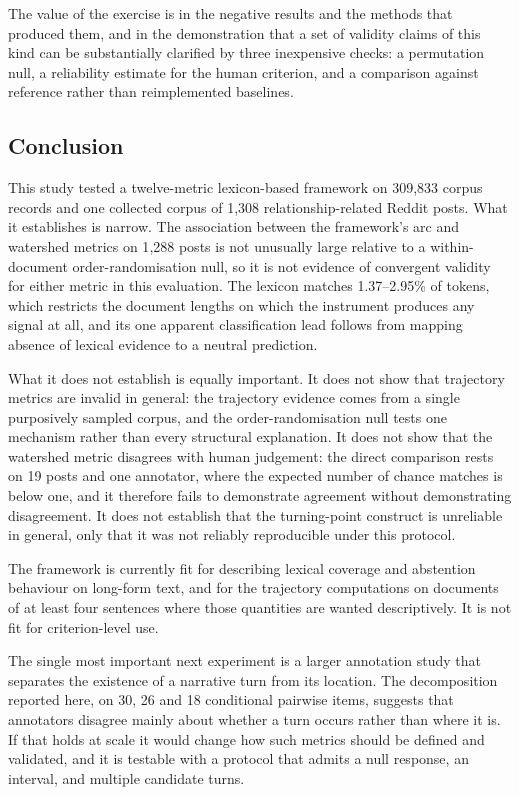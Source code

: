 \documentclass[fleqn,10pt]{wlscirep}
\begin{document}
The value of the exercise is in the negative results and the methods that produced them, and in the demonstration that a set of validity claims of this kind can be substantially clarified by three inexpensive checks: a permutation null, a reliability estimate for the human criterion, and a comparison against reference rather than reimplemented baselines.

\subsection{Conclusion}

This study tested a twelve-metric lexicon-based framework on 309{,}833 corpus
records and one collected corpus of 1{,}308 relationship-related Reddit posts.
What it establishes is narrow. The association between the framework's arc and
watershed metrics on 1{,}288 posts is not unusually large relative to a
within-document order-randomisation null, so it is not evidence of convergent
validity for either metric in this evaluation. The lexicon matches 1.37--2.95\%
of tokens, which restricts the document lengths on which the instrument produces
any signal at all, and its one apparent classification lead follows from mapping
absence of lexical evidence to a neutral prediction.

What it does not establish is equally important. It does not show that
trajectory metrics are invalid in general: the trajectory evidence comes from a
single purposively sampled corpus, and the order-randomisation null tests one
mechanism rather than every structural explanation. It does not show that the
watershed metric disagrees with human judgement: the direct comparison rests on
19 posts and one annotator, where the expected number of chance matches is below
one, and it therefore fails to demonstrate agreement without demonstrating
disagreement. It does not establish that the turning-point construct is
unreliable in general, only that it was not reliably reproducible under this
protocol.

The framework is currently fit for describing lexical coverage and abstention
behaviour on long-form text, and for the trajectory computations on documents of
at least four sentences where those quantities are wanted descriptively. It is
not fit for criterion-level use.

The single most important next experiment is a larger annotation study that
separates the existence of a narrative turn from its location. The decomposition
reported here, on 30, 26 and 18 conditional pairwise items, suggests that
annotators disagree mainly about whether a turn occurs rather than where it is.
If that holds at scale it would change how such metrics should be defined and
validated, and it is testable with a protocol that admits a null response, an
interval, and multiple candidate turns.
\end{document}
